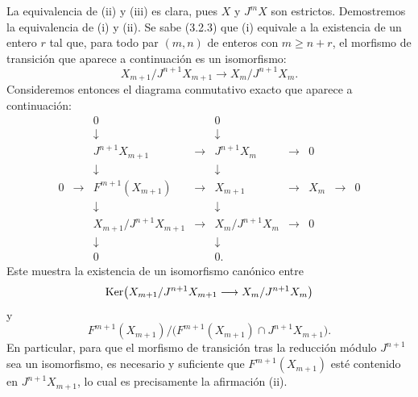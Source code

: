 \begin{prooftext}
La equivalencia de (ii) y (iii) es clara, pues \(X\) y \(J^mX\) son estrictos. Demostremos la equivalencia de (i) y (ii). Se sabe (3.2.3) que (i) equivale a la existencia de un entero \(r\) tal que, para todo par \((m,n)\) de enteros con \(m\ge n+r\), el morfismo de transición que aparece a continuación es un isomorfismo:
\[
X_{m+1}/J^{n+1}X_{m+1}\longrightarrow X_m/J^{n+1}X_m.
\]
Consideremos entonces el diagrama conmutativo exacto que aparece a continuación:
\[
\begin{array}{ccccccccccc}
&&0&&0\\
&&\downarrow&&\downarrow\\
&&J^{n+1}X_{m+1}&\longrightarrow&J^{n+1}X_m&\longrightarrow&0\\
&&\downarrow&&\downarrow\\
0&\longrightarrow&F^{m+1}(X_{m+1})&\longrightarrow&X_{m+1}&\longrightarrow&X_m&\longrightarrow&0\\
&&\downarrow&&\downarrow\\
&&X_{m+1}/J^{n+1}X_{m+1}&\longrightarrow&X_m/J^{n+1}X_m&\longrightarrow&0\\
&&\downarrow&&\downarrow\\
&&0&&0 .
\end{array}
\]
Este muestra la existencia de un isomorfismo canónico entre
\[
\operatorname{Ker}\bigl(X_{m+1}/J^{n+1}X_{m+1}
       \longrightarrow X_m/J^{n+1}X_m\bigr)
\]
y
\[
F^{m+1}(X_{m+1})/
\bigl(F^{m+1}(X_{m+1})\cap J^{n+1}X_{m+1}\bigr).
\]
En particular, para que el morfismo de transición tras la reducción módulo \(J^{n+1}\) sea un isomorfismo, es necesario y suficiente que \(F^{m+1}(X_{m+1})\) esté contenido en \(J^{n+1}X_{m+1}\), lo cual es precisamente la afirmación (ii).
\end{prooftext}
